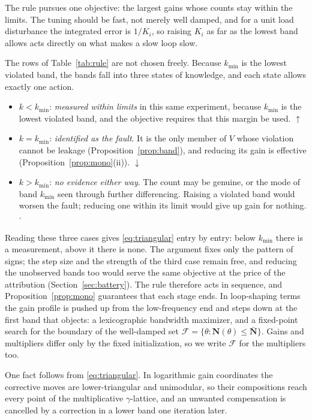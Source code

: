 \documentclass[final,3p,times,twocolumn]{elsarticle}
\begin{document}
The rule pursues one objective: the largest gains whose counts stay
within the limits. The tuning should be fast, not merely well damped,
and for a unit load disturbance the integrated error is $1/K_i$, so
raising
$K_i$ as far as the lowest band allows acts directly on what makes a
slow loop slow.

The rows of Table~\ref{tab:rule} are not chosen freely. Because
$k_{\min}$ is the lowest violated band, the bands fall into three states
of knowledge, and each state allows exactly one action.

\begin{itemize}[leftmargin=1.4em, itemsep=1pt, topsep=2pt]
\item $k < k_{\min}$: \emph{measured within limits} in this same
experiment, because $k_{\min}$ is the lowest violated band, and the
objective requires that this margin be used. $\uparrow$
\item $k = k_{\min}$: \emph{identified as the fault}. It is the only
member of $V$ whose violation cannot be leakage
(Proposition~\ref{prop:band}), and reducing its gain is effective
(Proposition~\ref{prop:mono}(ii)). $\downarrow$
\item $k > k_{\min}$: \emph{no evidence either way}. The count may be
genuine, or the mode of band $k_{\min}$ seen through further
differencing. Raising a violated band would worsen the fault; reducing
one within its limit would give up gain for nothing. $\cdot$
\end{itemize}

Reading these three cases gives \eqref{eq:triangular} entry by entry:
below $k_{\min}$ there is a measurement, above it there is none. The
argument fixes only the pattern of signs; the step size and the strength
of the third case remain free, and reducing the unobserved bands too
would serve the same objective at the price of the attribution
(Section~\ref{sec:battery}). The rule therefore acts in sequence, and
Proposition~\ref{prop:mono} guarantees that each stage ends.
In loop-shaping terms the gain profile is pushed up from the
low-frequency end and steps down at the first band that objects: a
lexicographic bandwidth maximizer, and a fixed-point search for the
boundary of the well-damped set
$\mathcal F = \{\theta : \mathbf N(\theta) \le \bar{\mathbf N}\}$. Gains
and multipliers differ only by the fixed initialization, so we write
$\mathcal F$ for the multipliers too.

One fact follows from \eqref{eq:triangular}. In logarithmic gain
coordinates the corrective moves are lower-triangular and unimodular, so
their compositions reach every point of the multiplicative
$\gamma$-lattice, and an unwanted compensation is cancelled by a
correction in a lower band one iteration later.
\end{document}
